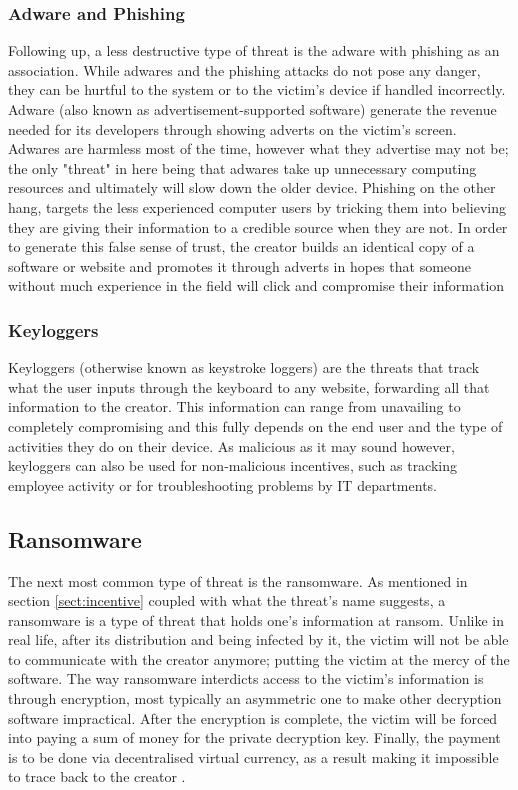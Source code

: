 \subsubsection{Adware and Phishing}
\noindent Following up, a less destructive type of threat is the adware with phishing as an association. While adwares and the phishing attacks do not pose any danger, they can be hurtful to the system or to the victim's device if handled incorrectly. Adware (also known as advertisement-supported software) generate the revenue needed for its developers through showing adverts on the victim's screen. Adwares are harmless most of the time, however what they advertise may not be; the only "threat" in here being that adwares take up unnecessary computing resources and ultimately will slow down the older device. Phishing on the other hang, targets the less experienced computer users by tricking them into believing they are giving their information to a credible source when they are not. In order to generate this false sense of trust, the creator builds an identical copy of a software or website and promotes it through adverts in hopes that someone without much experience in the field will click and compromise their information

\subsubsection{Keyloggers}
\noindent Keyloggers (otherwise known as keystroke loggers) are the threats that track what the user inputs through the keyboard to any website, forwarding all that information to the creator. This information can range from unavailing to completely compromising and this fully depends on the end user and the type of activities they do on their device. As malicious as it may sound however, keyloggers can also be used for non-malicious incentives, such as tracking employee activity or for troubleshooting problems by IT departments. 

\subsection{Ransomware}
\noindent The next most common type of threat is the ransomware. As mentioned in section \ref{sect:incentive} coupled with what the threat's name suggests, a ransomware is a type of threat that holds one's information at ransom. Unlike in real life, after its distribution and being infected by it, the victim will not be able to communicate with the creator anymore; putting the victim at the mercy of the software. The way ransomware interdicts access to the victim's information is through encryption, most typically an asymmetric one to make other decryption software impractical. After the encryption is complete, the victim will be forced into paying a sum of money for the private decryption key. Finally, the payment is to be done via decentralised virtual currency, as a result making it impossible to trace back to the creator \cite{mabunda2018cryptocurrency}.



